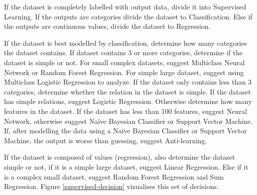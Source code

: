 \documentclass[titlepage]{article}
\begin{document}
If the dataset is completely labelled with output data, divide it into Supervised Learning. 
If the outputs are categories divide the dataset to Classification. 
Else if the outputs are continuous values, divide the dataset to Regression.

If the dataset is best modelled by classification, determine how many categories the dataset contains. 
If dataset contains 3 or more categories, determine if the dataset is simple or not. 
For small complex datasets, suggest Multiclass Neural Network or Random Forest Regression. 
For simple large dataset, suggest using Multiclass Logistic Regression to analyze. 
If the dataset only contains less than 3 categories, determine whether the relation in the dataset is simple. 
If the dataset has simple relations, suggest Logistic Regression. Otherwise determine how many features in the dataset. 
If the dataset has less than 100 features, suggest Neural Network, otherwise suggest Naïve Bayesian Classifier or Support Vector Machine. 
If, after modelling the data using a Naïve Bayesian Classifier or Support Vector Machine, the output is worse than guessing, suggest Anti-learning.

If the dataset is composed of values (regression), also determine the dataset simple or not, if it is a simple large dataset, suggest Linear Regression. 
Else if it is a complex small dataset, suggest Random Forest Regression and Sum Regression. 
Figure \ref{supervised-decision} vizualises this set of decisions.
\end{document}
